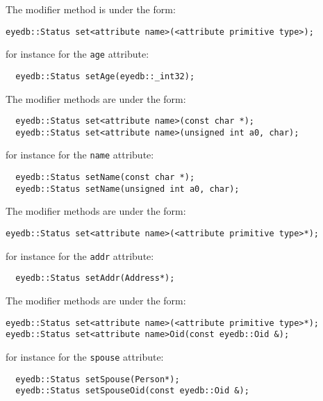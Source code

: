 The modifier method is under the form:
\verbsize
\begin{verbatim}
eyedb::Status set<attribute name>(<attribute primitive type>);
\end{verbatim}
\normalsize
for instance for the \texttt{age} attribute:
\verbsize
\begin{verbatim}
  eyedb::Status setAge(eyedb::_int32);
\end{verbatim}
\normalsize
{}
The modifier methods are under the form:
\verbsize
\begin{verbatim}
  eyedb::Status set<attribute name>(const char *);
  eyedb::Status set<attribute name>(unsigned int a0, char);
\end{verbatim}
\normalsize
for instance for the \texttt{name} attribute:
\verbsize
\begin{verbatim}
  eyedb::Status setName(const char *);
  eyedb::Status setName(unsigned int a0, char);
\end{verbatim}
\normalsize

The modifier methods are under the form:
\verbsize
\begin{verbatim}
eyedb::Status set<attribute name>(<attribute primitive type>*);
\end{verbatim}
\normalsize
for instance for the \texttt{addr} attribute:
\verbsize
\begin{verbatim}
  eyedb::Status setAddr(Address*);
\end{verbatim}
\normalsize

The modifier methods are under the form:
\verbsize
\begin{verbatim}
eyedb::Status set<attribute name>(<attribute primitive type>*);
eyedb::Status set<attribute name>Oid(const eyedb::Oid &);
\end{verbatim}
\normalsize
for instance for the \texttt{spouse} attribute:
\verbsize
\begin{verbatim}
  eyedb::Status setSpouse(Person*);
  eyedb::Status setSpouseOid(const eyedb::Oid &);
\end{verbatim}
\normalsize

